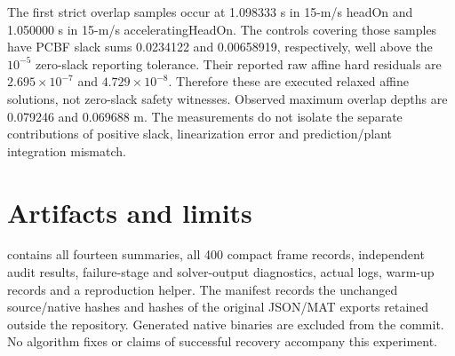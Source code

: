 \documentclass[11pt]{article}
\begin{document}
The first strict overlap samples occur at 1.098333 s in 15-m/s headOn and
1.050000 s in 15-m/s acceleratingHeadOn. The controls covering those samples
have PCBF slack sums 0.0234122 and 0.00658919, respectively, well above the
$10^{-5}$ zero-slack reporting tolerance. Their reported raw affine hard
residuals are $2.695\times10^{-7}$ and $4.729\times10^{-8}$. Therefore these
are executed relaxed affine solutions, not zero-slack safety witnesses.
Observed maximum overlap depths are 0.079246 and 0.069688 m. The measurements
do not isolate the separate contributions of positive slack, linearization
error and prediction/plant integration mismatch.

\section{Artifacts and limits}
 contains all fourteen summaries,
all 400 compact frame records, independent audit results, failure-stage and
solver-output diagnostics, actual logs, warm-up records and a reproduction
helper. The manifest records the unchanged source/native hashes and hashes of
the original JSON/MAT exports retained outside the repository. Generated
native binaries are excluded from the commit. No algorithm fixes or claims of
successful recovery accompany this experiment.
\end{document}
